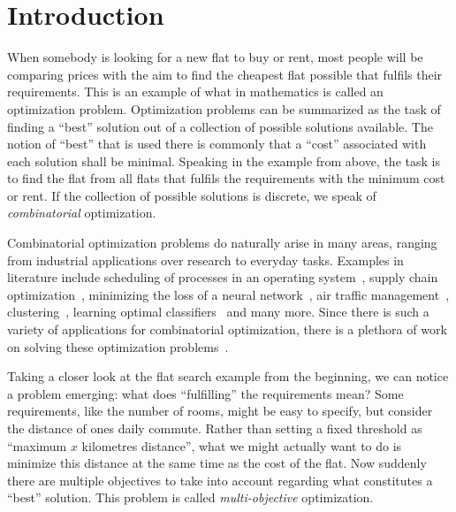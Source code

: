 \chapter{Introduction\label{chap:intro}}

When somebody is looking for a new flat to buy or rent, most people will be comparing prices with the aim to find the cheapest flat possible that fulfils their requirements.
This is an example of what in mathematics is called an optimization problem.
Optimization problems can be summarized as the task of finding a ``best'' solution out of a collection of possible solutions available.
The notion of ``best'' that is used there is commonly that a ``cost'' associated with each solution shall be minimal.
Speaking in the example from above, the task is to find the flat from all flats that fulfils the requirements with the minimum cost or rent.
If the collection of possible solutions is discrete, we speak of \emph{combinatorial} optimization.

Combinatorial optimization problems do naturally arise in many areas, ranging from industrial applications over research to everyday tasks.
Examples in literature include scheduling of processes in an operating system~\autocite{}, supply chain optimization~\autocite{}, minimizing the loss of a neural network~\autocite{}, air traffic management~\autocite{}, clustering~\autocite{}, learning optimal classifiers~\autocite{} and many more.
Since there is such a variety of applications for combinatorial optimization, there is a plethora of work on solving these optimization problems~\autocite{}.

Taking a closer look at the flat search example from the beginning, we can notice a problem emerging:
what does ``fulfilling'' the requirements mean?
Some requirements, like the number of rooms, might be easy to specify, but consider the distance of ones daily commute.
Rather than setting a fixed threshold as ``maximum $x$ kilometres distance'', what we might actually want to do is minimize this distance at the same time as the cost of the flat.
Now suddenly there are multiple objectives to take into account regarding what constitutes a ``best'' solution.
This problem is called \emph{multi-objective} optimization.

